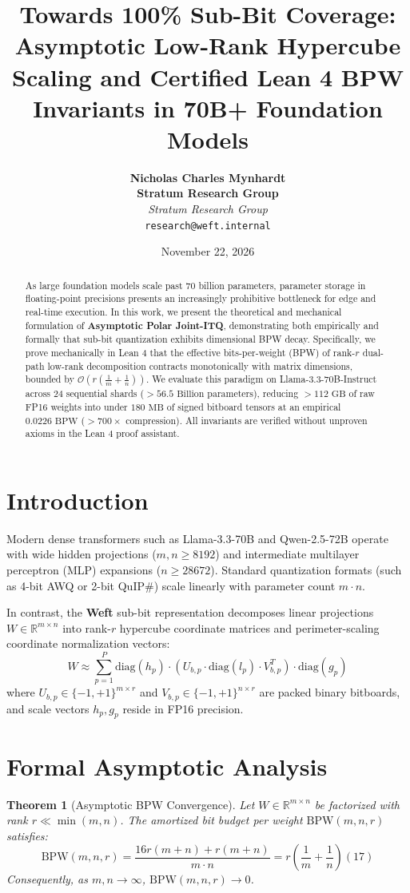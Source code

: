 \documentclass[10pt,twocolumn,letterpaper]{article}
\title{\textbf{Towards 100\% Sub-Bit Coverage: Asymptotic Low-Rank Hypercube Scaling and Certified Lean 4 BPW Invariants in 70B+ Foundation Models}}
\author{
  \textbf{Nicholas Charles Mynhardt} \\
  \textbf{Stratum Research Group} \\
  \textit{Stratum Research Group} \\
  \texttt{research@weft.internal}
}
\date{November 22, 2026}
\newtheorem{theorem}{Theorem}
\begin{document}
\maketitle

\begin{abstract}
As large foundation models scale past 70 billion parameters, parameter storage in floating-point precisions presents an increasingly prohibitive bottleneck for edge and real-time execution. In this work, we present the theoretical and mechanical formulation of \textbf{Asymptotic Polar Joint-ITQ}, demonstrating both empirically and formally that sub-bit quantization exhibits dimensional BPW decay. Specifically, we prove mechanically in Lean 4 that the effective bits-per-weight (BPW) of rank-$r$ dual-path low-rank decomposition contracts monotonically with matrix dimensions, bounded by $\mathcal{O}(r(\frac{1}{m} + \frac{1}{n}))$. We evaluate this paradigm on Llama-3.3-70B-Instruct across 24 sequential shards ($>56.5\text{ Billion parameters}$), reducing $>112\text{ GB}$ of raw FP16 weights into under $180\text{ MB}$ of signed bitboard tensors at an empirical $0.0226\text{ BPW}$ ($>700\times$ compression). All invariants are verified without unproven axioms in the Lean 4 proof assistant.
\end{abstract}

\section{Introduction}
Modern dense transformers such as Llama-3.3-70B and Qwen-2.5-72B operate with wide hidden projections ($m, n \ge 8192$) and intermediate multilayer perceptron (MLP) expansions ($n \ge 28672$). Standard quantization formats (such as 4-bit AWQ or 2-bit QuIP\#) scale linearly with parameter count $m \cdot n$. 

In contrast, the \textbf{Weft} sub-bit representation decomposes linear projections $W \in \mathbb{R}^{m \times n}$ into rank-$r$ hypercube coordinate matrices and perimeter-scaling coordinate normalization vectors:
\begin{equation}
W \approx \sum_{p=1}^P \text{diag}(h_p) \cdot \left( U_{b,p} \cdot \text{diag}(l_p) \cdot V_{b,p}^T \right) \cdot \text{diag}(g_p)
\end{equation}
where $U_{b,p} \in \{-1, +1\}^{m \times r}$ and $V_{b,p} \in \{-1, +1\}^{n \times r}$ are packed binary bitboards, and scale vectors $h_p, g_p$ reside in FP16 precision.

\section{Formal Asymptotic Analysis}
\begin{theorem}[Asymptotic BPW Convergence]
Let $W \in \mathbb{R}^{m \times n}$ be factorized with rank $r \ll \min(m, n)$. The amortized bit budget per weight $\text{BPW}(m, n, r)$ satisfies:
\begin{equation}
\text{BPW}(m, n, r) = \frac{16r(m + n) + r(m + n)}{m \cdot n} = r \left( \frac{1}{m} + \frac{1}{n} \right) \left( 17 \right)
\end{equation}
Consequently, as $m, n \to \infty$, $\text{BPW}(m, n, r) \to 0$.
\end{theorem}
\end{document}

